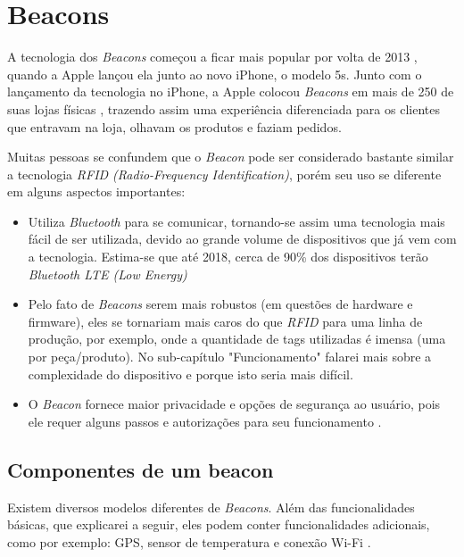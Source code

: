 \documentclass[
	12pt,
	oneside,
	a4paper,
	english,
	brazil,
]{abntex2}
\begin{document}
\section{Beacons}

A tecnologia dos \emph{Beacons} começou a ficar mais popular por volta de 2013 \cite{beacon-what-is-it-forbes}, quando a Apple lançou ela junto ao novo iPhone, o modelo 5s. Junto com o lançamento da tecnologia no iPhone, a Apple colocou \emph{Beacons} em mais de 250 de suas lojas físicas \cite{beacon-apple-store-case}, trazendo assim uma experiência diferenciada para os clientes que entravam na loja, olhavam os produtos e faziam pedidos.

Muitas pessoas se confundem que o \emph{Beacon} pode ser considerado bastante similar a tecnologia \emph{RFID (Radio-Frequency Identification)}, porém seu uso se diferente em alguns aspectos importantes:

\begin{itemize}
    \item Utiliza \emph{Bluetooth} para se comunicar, tornando-se assim uma tecnologia mais fácil de ser utilizada, devido ao grande volume de dispositivos que já vem com a tecnologia. Estima-se que até 2018, cerca de 90\% dos dispositivos terão \emph{Bluetooth LTE (Low Energy)} \cite{beacon-devices-estimate-2018}
    \item Pelo fato de \emph{Beacons} serem mais robustos (em questões de hardware e firmware), eles se tornariam mais caros do que \emph{RFID} para uma linha de produção, por exemplo, onde a quantidade de tags utilizadas é imensa (uma por peça/produto). No sub-capítulo "Funcionamento" falarei mais sobre a complexidade do dispositivo e porque isto seria mais difícil.
    \item O \emph{Beacon} fornece maior privacidade e opções de segurança ao usuário, pois ele requer alguns passos e autorizações para seu funcionamento \cite{beacon-apple-store-case}.
\end{itemize}

\subsection{Componentes de um beacon}

Existem diversos modelos diferentes de \emph{Beacons}. Além das funcionalidades básicas, que explicarei a seguir, eles podem conter funcionalidades adicionais, como por exemplo: GPS, sensor de temperatura e conexão Wi-Fi \cite{beacon-sensors-easy-kontakt}.
\end{document}
